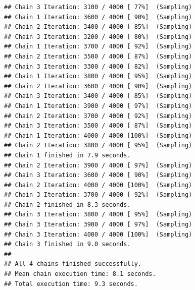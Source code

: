 \documentclass[
]{article}
\begin{document}
\begin{verbatim}
## Chain 3 Iteration: 3100 / 4000 [ 77%]  (Sampling) 
## Chain 1 Iteration: 3600 / 4000 [ 90%]  (Sampling) 
## Chain 2 Iteration: 3400 / 4000 [ 85%]  (Sampling) 
## Chain 3 Iteration: 3200 / 4000 [ 80%]  (Sampling) 
## Chain 1 Iteration: 3700 / 4000 [ 92%]  (Sampling) 
## Chain 2 Iteration: 3500 / 4000 [ 87%]  (Sampling) 
## Chain 3 Iteration: 3300 / 4000 [ 82%]  (Sampling) 
## Chain 1 Iteration: 3800 / 4000 [ 95%]  (Sampling) 
## Chain 2 Iteration: 3600 / 4000 [ 90%]  (Sampling) 
## Chain 3 Iteration: 3400 / 4000 [ 85%]  (Sampling) 
## Chain 1 Iteration: 3900 / 4000 [ 97%]  (Sampling) 
## Chain 2 Iteration: 3700 / 4000 [ 92%]  (Sampling) 
## Chain 3 Iteration: 3500 / 4000 [ 87%]  (Sampling) 
## Chain 1 Iteration: 4000 / 4000 [100%]  (Sampling) 
## Chain 2 Iteration: 3800 / 4000 [ 95%]  (Sampling) 
## Chain 1 finished in 7.9 seconds.
## Chain 2 Iteration: 3900 / 4000 [ 97%]  (Sampling) 
## Chain 3 Iteration: 3600 / 4000 [ 90%]  (Sampling) 
## Chain 2 Iteration: 4000 / 4000 [100%]  (Sampling) 
## Chain 3 Iteration: 3700 / 4000 [ 92%]  (Sampling) 
## Chain 2 finished in 8.3 seconds.
## Chain 3 Iteration: 3800 / 4000 [ 95%]  (Sampling) 
## Chain 3 Iteration: 3900 / 4000 [ 97%]  (Sampling) 
## Chain 3 Iteration: 4000 / 4000 [100%]  (Sampling) 
## Chain 3 finished in 9.0 seconds.
## 
## All 4 chains finished successfully.
## Mean chain execution time: 8.1 seconds.
## Total execution time: 9.3 seconds.
\end{verbatim}
\end{document}
